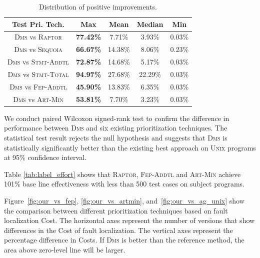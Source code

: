 \begin{table}[!htbp]
    \centering
		\caption{Distribution of positive improvements.}
		\renewcommand{\arraystretch}{1.5}
		\small
        \begin{tabular}{|c|c|c|c|c|}
			\hline
			Test Pri. Tech.  &        Max &       Mean &     Median &        Min \\
			\hline\hline
			\textsc{Dms} vs \textsc{Raptor} & {\bf 77.42\%} &     7.71\% &     3.93\% &     0.03\% \\
			\hline
			\textsc{Dms} vs \textsc{Sequoia} & {\bf 66.67\%} &    14.38\% &     8.06\% &     0.23\% \\
			\hline
			\textsc{Dms} vs \textsc{Stmt-Addtl} & {\bf 72.87\%} &    14.68\% &     5.17\% &     0.03\% \\
			\hline
			\textsc{Dms} vs \textsc{Stmt-Total} & {\bf 94.97\%} &    27.68\% &    22.29\% &     0.03\% \\
			\hline
			\textsc{Dms} vs \textsc{Fep-Addtl} & {\bf 45.90\%} &    13.83\% &     6.35\% &     0.03\% \\
			\hline
			\textsc{Dms} vs \textsc{Art-Min} & {\bf 53.81\%} &     7.70\% &     3.23\% &     0.03\% \\
			\hline
		\end{tabular}
    \label{tab:compare_21}
\end{table}

We conduct paired Wilcoxon signed-rank test to confirm the difference in performance between \textsc{Dms} and six existing prioritization techniques.
The statistical test result rejects the null hypothesis and suggests that \textsc{Dms} is statistically significantly
better than the existing best approach on \textsc{Unix} programs at 95\% confidence interval.

\vspace{0.2cm}
 Table \ref{tab:label_effort} shows that \textsc{Raptor}, \textsc{Fep-Addtl} and \textsc{Art-Min} achieve 101\% base line effectiveness with less than 500 test cases on subject programs.


Figure~\ref{fig:our_vs_fep}, \ref{fig:our_vs_artmin}, and~\ref{fig:our_vs_ag_unix}
show the comparison between different
prioritization techniques based on fault localization Cost.
The horizontal axes represent the number of versions that
show differences in the Cost of
fault localization. The vertical axes represent the percentage
difference in Costs. If \textsc{Dms} is better than the reference
method, the area above zero-level line will be larger.

